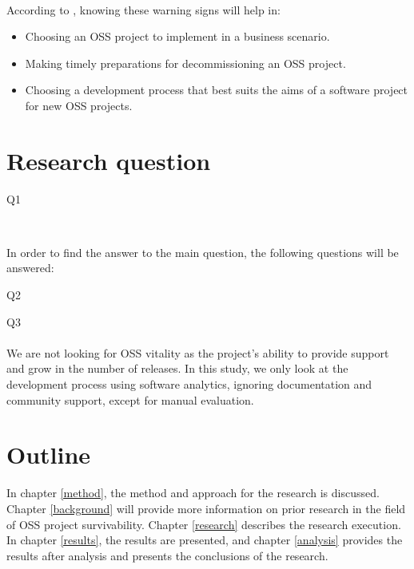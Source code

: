 \paragraph{}
According to \citet{karus2013}, knowing these warning signs will help in:
\begin{itemize}
	\item Choosing an OSS project to implement in a business scenario.
	\item Making timely preparations for decommissioning an OSS project.
	\item Choosing a development process that best suits the aims of a software
	project for new OSS projects.
\end{itemize}




\section{Research question}
\label{questions}

\begin{description}
	\item[Q1\label{itm:question_warningsigns}]
	\emph{\researchQuestion}\\[0.3cm]
\end{description}

\noindent
In order to find the answer to the main question, the following
questions will be answered:
\begin{description}
	\item[Q2\label{itm:question_patterns}] \emph{\subQuestionOne}
	\item[Q3\label{itm:question_successfailure}] \emph{\subQuestionTwo}
\end{description}

\paragraph{}
We are not looking for OSS vitality as the project's ability to provide support
and grow in the number of releases. In this study, we only look at the
development process using software analytics, ignoring documentation and
community support, except for manual evaluation.



\section{Outline}

In chapter \ref{method}, the method and approach for the research is discussed.
Chapter \ref{background} will provide more information on prior research in the
field of OSS project survivability. Chapter \ref{research} describes the
research execution. In chapter \ref{results}, the results are presented, and
chapter \ref{analysis} provides the results after analysis and presents the
conclusions of the research.

